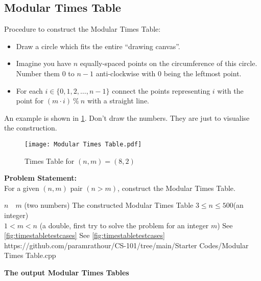 \documentclass[../../Problems]{subfiles}
\begin{document}
\recalctypearea
\subsection{Modular Times Table}{\label{pp:timestable}}
Procedure to construct the Modular Times Table:
\begin{itemize}
	\item Draw a circle which fits the entire ``drawing canvas''.
	\item Imagine you have $n$ equally-spaced points on the circumference of this circle. Number them $0$ to $n-1$ anti-clockwise with $0$ being the leftmost point.
	\item For each $i \in \{0,1,2,\ldots,n-1\}$ connect the points representing $i$ with the point for $(m\cdot i)\ \%\ n$ with a straight line.
\end{itemize} An example is shown in \ref{fig:timestable}. Don't draw the numbers. They are just to visualise the construction.
\begin{figure}[H]
	\centering
	\texttt{[image: Modular Times Table.pdf]}
	\caption{Times Table for $(n,m)=(8,2)$}
	\label{fig:timestable}
\end{figure}
\textbf{Problem Statement:}\\
For a given $(n,m)$ pair $(n>m)$, construct the Modular Times Table.
\begin{testcases}
	{$n\quad m$ \hfill(two numbers)}
	{The constructed Modular Times Table}
	{$3 \leq n \leq 500$\hfill(an integer)\\
	$1 < m < n$ \hfill(a double, first try to solve the problem for an integer $m$)}
	{See \ref{fig:timestabletestcases}}
	{See \ref{fig:timestabletestcases}}
	{https://github.com/paramrathour/CS-101/tree/main/Starter Codes/Modular Times Table.cpp}
\end{testcases}
\textbf{The output Modular Times Tables}
\end{document}
